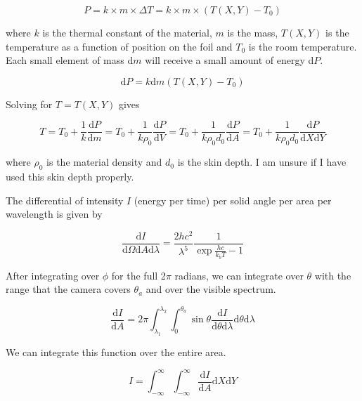 \documentclass[12pt]{article}
\begin{document}
\begin{equation}
P=k \times m \times \Delta T=k \times m \times (T(X,Y)-T_0)
\end{equation}

where $k$ is the thermal constant of the material, $m$ is the mass, $T(X,Y)$ is the temperature as a function of position on the foil and $T_0$ is the room temperature. Each small element of mass d$m$ will receive a small amount of energy d$P$.

\begin{equation}
\mathrm{d}P=k \mathrm{d}m (T(X,Y)-T_0)
\end{equation}

Solving for $T=T(X,Y)$ gives

\begin{equation}
T=T_0+\frac{1}{k} \frac{\mathrm{d}P}{\mathrm{d}m}=T_0+\frac{1}{k \rho_0} \frac{\mathrm{d}P}{\mathrm{d}V}=T_0+\frac{1}{k \rho_0 d_0} \frac{\mathrm{d}P}{\mathrm{d}A}=T_0+\frac{1}{k \rho_0 d_0} \frac{\mathrm{d}P}{\mathrm{d}X \mathrm{d}Y}
\end{equation}

where $\rho_0$ is the material density and $d_0$ is the skin depth. I am unsure if I have used this skin depth properly.

The differential of intensity $I$ (energy per time) per solid angle per area per wavelength is given by

\begin{equation}
\frac{\mathrm{d}I}{\mathrm{d} \Omega \mathrm{d}A \mathrm{d} \lambda}=\frac{2hc^2}{\lambda^5} \frac{1}{\exp{\frac{hc}{k_b T}}-1}
\end{equation}

After integrating over $\phi$ for the full 2$\pi$ radians, we can integrate over $\theta$ with the range that the camera covers $\theta_a$ and over the visible spectrum.

\begin{equation}
\frac{\mathrm{d}I}{\mathrm{d}A}=2 \pi \int_{\lambda_1}^{\lambda_2} \int_0^{\theta_a} \sin \theta \frac{\mathrm{d}I}{\mathrm{d} \theta \mathrm{d} \lambda} \mathrm{d} \theta \mathrm{d} \lambda
\end{equation}

We can integrate this function over the entire area.

\begin{equation}
I=\int_{-\infty}^{\infty} \int_{-\infty}^{\infty} \frac{\mathrm{d}I}{\mathrm{d}A} \mathrm{d}X \mathrm{d}Y
\end{equation}
\end{document}
